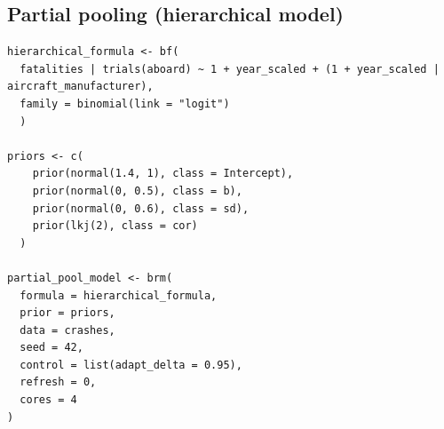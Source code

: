 \documentclass[12pt,a4paper]{article}
\begin{document}
\subsection{Partial pooling (hierarchical model)}

\begin{lstlisting}
hierarchical_formula <- bf(
  fatalities | trials(aboard) ~ 1 + year_scaled + (1 + year_scaled | aircraft_manufacturer),
  family = binomial(link = "logit")
  )

priors <- c(
    prior(normal(1.4, 1), class = Intercept),
    prior(normal(0, 0.5), class = b),
    prior(normal(0, 0.6), class = sd),
    prior(lkj(2), class = cor)
  )

partial_pool_model <- brm(
  formula = hierarchical_formula,
  prior = priors,
  data = crashes,
  seed = 42,
  control = list(adapt_delta = 0.95),
  refresh = 0,
  cores = 4
)
\end{lstlisting}
\end{document}
